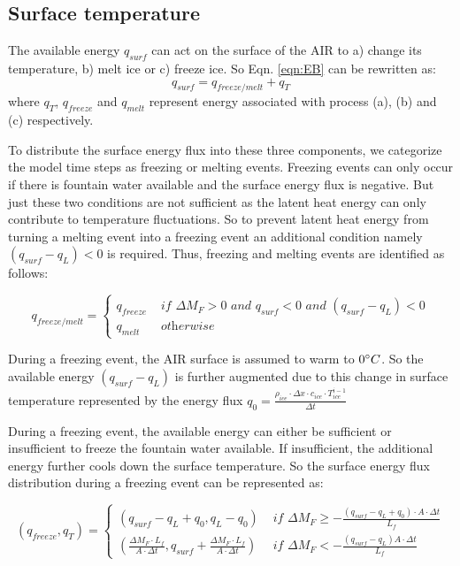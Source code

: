 \documentclass[utf8]{frontiersSCNS} %
\begin{document}
\subsection{Surface temperature}
The available energy $q_{surf}$ can act on the surface of the AIR to a) change its temperature, b) melt ice or
c) freeze ice. So Eqn. \ref{eqn:EB} can be rewritten as: \begin{equation} q_{surf} = q_{freeze/melt} +
q_{T} \end{equation}
where $q_{T}$, $q_{freeze}$ and $q_{melt}$ represent energy associated with process (a), (b) and (c) respectively.

To distribute the surface energy flux into these three components, we categorize the model time steps as freezing or
melting events. Freezing events can only occur if there is fountain water available and the surface energy flux is
negative. But just these two conditions are not sufficient as the latent heat energy can only contribute to temperature
fluctuations. So to prevent latent heat energy from turning a melting event into a freezing event an additional
condition namely $(q_{surf}-q_{L}) < 0$ is required. Thus, freezing and melting events are identified as follows:

\begin{equation} 
    q_{freeze/melt} = \left\{ \begin{array}{ll}
            q_{freeze} & \textit{ if } \Delta M_{F} > 0 \textit{ and } q_{surf} < 0 \textit{ and }(q_{surf}-q_{L}) < 0 \\
            q_{melt} & \textit{ otherwise} 
    \end{array} \right. 
\end{equation} 

During a freezing event, the AIR surface is assumed to warm to $0 \degree C$. So the available energy $(q_{surf}-q_{L})$
is further augmented due to this change in surface temperature represented by the energy flux  
$q_{0} = \frac{\rho_{ice} \cdot \Delta x \cdot c_{ice} \cdot T_{ice}^{i-1}}{\Delta t}$

During a freezing event, the available energy can either be sufficient or insufficient to freeze the fountain water
available.  If insufficient, the additional energy further cools down the surface temperature. So the surface energy
flux distribution during a freezing event can be represented as:

\begin{equation} 
    (q_{freeze}, q_{T}) = \left\{ \begin{array}{ll}
            (q_{surf}-q_{L}+q_{0}, q_{L}-q_{0}) & \textit{ if } \Delta M_{F} \geq -\frac{(q_{surf}-q_{L}+q_{0}) \cdot A \cdot \Delta
        t}{L_f} \\
(\frac{\Delta M_{F} \cdot L_f 
        }{A \cdot \Delta t}
        , q_{surf}+\frac{\Delta M_{F} \cdot L_f 
        }{A \cdot \Delta t}) & \textit{ if } \Delta M_{F} < -\frac{(q_{surf}-q_{L}) A \cdot \Delta
        t}{L_f}
    \end{array} \right. 
\end{equation} 
\end{document}

